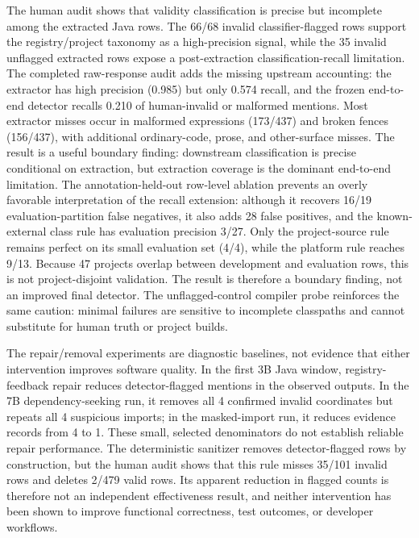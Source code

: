 \documentclass[pdflatex,sn-basic]{sn-jnl}
\newcommand{\codeid}[1]{\texttt{\detokenize{#1}}}
\begin{document}
The human audit shows that validity classification is precise but incomplete among the extracted Java rows. The 66/68 invalid classifier-flagged rows support the registry/project taxonomy as a high-precision signal, while the 35 invalid unflagged extracted rows expose a post-extraction classification-recall limitation. The completed raw-response audit adds the missing upstream accounting: the extractor has high precision (0.985) but only 0.574 recall, and the frozen end-to-end detector recalls 0.210 of human-invalid or malformed mentions. Most extractor misses occur in malformed expressions (173/437) and broken fences (156/437), with additional ordinary-code, prose, and other-surface misses. The result is a useful boundary finding: downstream classification is precise conditional on extraction, but extraction coverage is the dominant end-to-end limitation. The annotation-held-out row-level ablation prevents an overly favorable interpretation of the recall extension: although it recovers 16/19 evaluation-partition false negatives, it also adds 28 false positives, and the known-external class rule has evaluation precision 3/27. Only the project-source rule remains perfect on its small evaluation set (4/4), while the platform rule reaches 9/13. Because 47 projects overlap between development and evaluation rows, this is not project-disjoint validation. The result is therefore a boundary finding, not an improved final detector. The unflagged-control compiler probe reinforces the same caution: minimal \codeid{javac} failures are sensitive to incomplete classpaths and cannot substitute for human truth or project builds.

The repair/removal experiments are diagnostic baselines, not evidence that either intervention improves software quality. In the first 3B Java window, registry-feedback repair reduces detector-flagged mentions in the observed outputs. In the 7B dependency-seeking run, it removes all 4 confirmed invalid coordinates but repeats all 4 suspicious imports; in the masked-import run, it reduces evidence records from 4 to 1. These small, selected denominators do not establish reliable repair performance. The deterministic sanitizer removes detector-flagged rows by construction, but the human audit shows that this rule misses 35/101 invalid rows and deletes 2/479 valid rows. Its apparent reduction in flagged counts is therefore not an independent effectiveness result, and neither intervention has been shown to improve functional correctness, test outcomes, or developer workflows.
\end{document}
